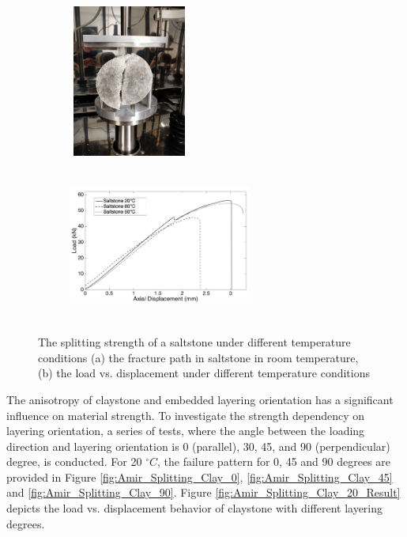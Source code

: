 \begin{figure}[!ht]
\centering
\begin{subfigure}[c]{0.35\textwidth}
\centering
\includegraphics[width=4cm,height=5cm]{figures/Amir_Splitting_Salt_20.png}
\subcaption{}
\label{fig:Amir_Splitting_Salt_20}
\end{subfigure}
\hfill
\begin{subfigure}[c]{0.6\textwidth}
\centering
\includegraphics[width=6cm,height=5cm]{figures/Amir_Splitting_Salt_Result.png}
\subcaption{}
\label{fig:Amir_Splitting_Salt_Result}
\end{subfigure}
\caption{The splitting strength of a saltstone under different temperature conditions (a) the fracture path in saltstone in room temperature, (b) the load vs. displacement under different temperature conditions}
\end{figure}

The anisotropy of claystone and embedded layering orientation has a significant influence on material strength. To investigate the strength dependency on layering orientation, a series of tests, where the angle between the loading direction and layering orientation is 0 (parallel), 30, 45, and 90 (perpendicular) degree, is conducted. For 20 $^{\circ}C$, the failure pattern for 0, 45 and 90 degrees are provided in Figure \ref{fig:Amir_Splitting_Clay_0}, \ref{fig:Amir_Splitting_Clay_45} and \ref{fig:Amir_Splitting_Clay_90}. Figure \ref{fig:Amir_Splitting_Clay_20_Result} depicts the load vs. displacement behavior of claystone with different layering degrees. 

